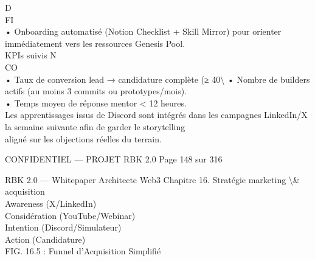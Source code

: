 \documentclass[12pt,landscape,a4paper]{article}
\newenvironment{confidential}
{\begin{tcolorbox}[
    colback=rbkred!5!white,
    colframe=rbkred!75!black,
    title=CONFIDENTIEL,
    fonttitle=\bfseries\color{white},
    coltitle=rbkred!75!black,
    breakable,
    enhanced,
    frame hidden,
    borderline west={2pt}{0pt}{rbkred!75!black}
]}
{\end{tcolorbox}}
\begin{document}
\vspace{0.5em}
D\\
FI\\
• Onboarding automatisé (Notion Checklist + Skill Mirror) pour orienter immédiatement vers les ressources Genesis Pool.\\
\vspace{0.5em}
KPIs suivis                                       N\\
CO\\
• Taux de conversion lead → candidature complète (≥ 40\textbackslash{}%
\vspace{0.5em}
• Nombre de builders actifs (au moins 3 commits ou prototypes/mois).\\
\vspace{0.5em}
• Temps moyen de réponse mentor \textless{} 12 heures.\\
\vspace{0.5em}
Les apprentissages issus de Discord sont intégrés dans les campagnes LinkedIn/X la semaine suivante afin de garder le storytelling\\
aligné sur les objections réelles du terrain.\\
\vspace{0.5em}
\vspace{0.5em}
\vspace{0.5em}
\vspace{0.5em}
\begin{confidential}CONFIDENTIEL — PROJET RBK 2.0                                 Page 148 sur 316\end{confidential}
RBK 2.0 — Whitepaper Architecte Web3                                                         Chapitre 16. Stratégie marketing \textbackslash{}& acquisition\\
\vspace{0.5em}
\vspace{0.5em}
Awareness (X/LinkedIn)\\
\vspace{0.5em}
Considération (YouTube/Webinar)\\
\vspace{0.5em}
Intention (Discord/Simulateur)\\
\vspace{0.5em}
Action (Candidature)\\
\vspace{0.5em}
FIG. 16.5 : Funnel d’Acquisition Simplifié\\
\vspace{0.5em}
\vspace{0.5em}
\vspace{0.5em}
\end{document}
